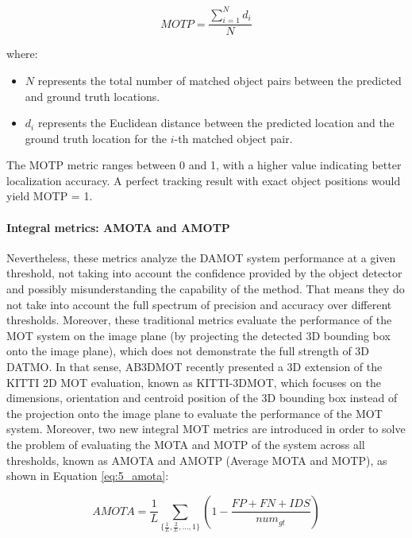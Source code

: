\begin{equation}
	MOTP = \frac{{\sum_{{i=1}}^{{N}} d_i}}{{N}}
\end{equation}

where:
\begin{itemize}
	\item \(N\) represents the total number of matched object pairs between the predicted and ground truth locations.
	\item \(d_i\) represents the Euclidean distance between the predicted location and the ground truth location for the \(i\)-th matched object pair.
\end{itemize}

The MOTP metric ranges between 0 and 1, with a higher value indicating better localization accuracy. A perfect tracking result with exact object positions would yield MOTP = 1.

\paragraph{Integral metrics: AMOTA and AMOTP}
\label{par:4_integral_metrics}

Nevertheless, these metrics analyze the DAMOT system performance at a given threshold, not taking into account the confidence provided by the object detector and possibly misunderstanding the capability of the method. That means they do not take into account the full spectrum of precision and accuracy over different thresholds. Moreover, these traditional metrics evaluate the performance of the MOT system on the image plane (by projecting the detected 3D bounding box onto the image plane), which does not demonstrate the full strength of 3D DATMO. In that sense, AB3DMOT \cite{weng20203d} recently presented a 3D extension of the KITTI 2D MOT evaluation, known as KITTI-3DMOT, which focuses on the dimensions, orientation and centroid position of the 3D bounding box instead of the projection onto the image plane to evaluate the performance of the MOT system. Moreover, two new integral MOT metrics are introduced in order to solve the problem of evaluating the MOTA and MOTP of the system across all thresholds, known as AMOTA and AMOTP (Average MOTA and MOTP), as shown in Equation \ref{eq:5_amota}:

\begin{equation}
	\label{eq:5_amota}
	AMOTA = \frac{1}{L}\sum_{\{\frac{1}{L},\frac{2}{L},...,1\}}(1-\frac{FP+FN+IDS}{num_{gt}})
\end{equation}

